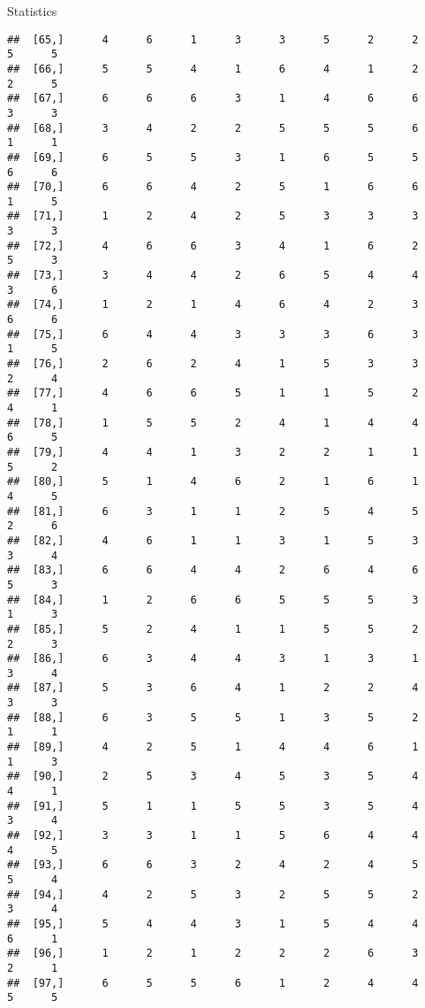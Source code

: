 \documentclass[
  ignorenonframetext,
]{beamer}
\begin{document}
\begin{frame}[fragile]{Statistics}
\begin{verbatim}
##  [65,]      4      6      1      3      3      5      2      2      5      5
##  [66,]      5      5      4      1      6      4      1      2      2      5
##  [67,]      6      6      6      3      1      4      6      6      3      3
##  [68,]      3      4      2      2      5      5      5      6      1      1
##  [69,]      6      5      5      3      1      6      5      5      6      6
##  [70,]      6      6      4      2      5      1      6      6      1      5
##  [71,]      1      2      4      2      5      3      3      3      3      3
##  [72,]      4      6      6      3      4      1      6      2      5      3
##  [73,]      3      4      4      2      6      5      4      4      3      6
##  [74,]      1      2      1      4      6      4      2      3      6      6
##  [75,]      6      4      4      3      3      3      6      3      1      5
##  [76,]      2      6      2      4      1      5      3      3      2      4
##  [77,]      4      6      6      5      1      1      5      2      4      1
##  [78,]      1      5      5      2      4      1      4      4      6      5
##  [79,]      4      4      1      3      2      2      1      1      5      2
##  [80,]      5      1      4      6      2      1      6      1      4      5
##  [81,]      6      3      1      1      2      5      4      5      2      6
##  [82,]      4      6      1      1      3      1      5      3      3      4
##  [83,]      6      6      4      4      2      6      4      6      5      3
##  [84,]      1      2      6      6      5      5      5      3      1      3
##  [85,]      5      2      4      1      1      5      5      2      2      3
##  [86,]      6      3      4      4      3      1      3      1      3      4
##  [87,]      5      3      6      4      1      2      2      4      3      3
##  [88,]      6      3      5      5      1      3      5      2      1      1
##  [89,]      4      2      5      1      4      4      6      1      1      3
##  [90,]      2      5      3      4      5      3      5      4      4      1
##  [91,]      5      1      1      5      5      3      5      4      3      4
##  [92,]      3      3      1      1      5      6      4      4      4      5
##  [93,]      6      6      3      2      4      2      4      5      5      4
##  [94,]      4      2      5      3      2      5      5      2      3      4
##  [95,]      5      4      4      3      1      5      4      4      6      1
##  [96,]      1      2      1      2      2      2      6      3      2      1
##  [97,]      6      5      5      6      1      2      4      4      5      5

\end{verbatim}
\end{frame}
\end{document}
